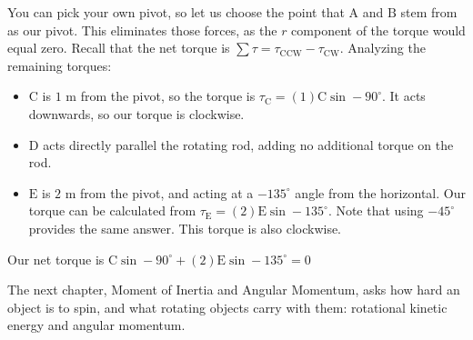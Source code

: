 \begin{Answer}[ref=opptorque2]
You can pick your own pivot, so let us choose the point that $\text{A}$ and $\text{B}$ stem from as our pivot. This eliminates those forces, as the $r$ component of the torque would equal zero. Recall that the net torque is $\sum \tau = \tau_\text{CCW} - \tau_\text{CW}$. Analyzing the remaining torques:
\begin{itemize}
  \item $\text{C}$ is $1 \text{ m}$ from the pivot, so the torque is $\tau_\text{C} = (1)\text{C}\sin-90^\circ$. It acts downwards, so our torque is clockwise.
  \item $\text{D}$ acts directly parallel the rotating rod, adding no additional torque on the rod.
  \item $\text{E}$ is $2 \text{ m}$ from the pivot, and acting at a $-135^\circ$ angle from the horizontal. Our torque can be calculated from $\tau_\text{E} = (2)\text{E}\sin-135^\circ$. Note that using $-45^\circ$ provides the same answer. This torque is also clockwise.
\end{itemize}

Our net torque is $\text{C}\sin-90^\circ + (2)\text{E}\sin-135^\circ = 0$

\end{Answer}

The next chapter, Moment of Inertia and Angular Momentum, asks how hard an object is to spin, and what
rotating objects carry with them: rotational kinetic energy and angular momentum.
